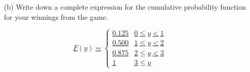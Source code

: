 \documentclass[12pt,a4paper]{article}
\numberwithin{equation}{subsection}
\def\doubleunderline#1{\underline{\underline{#1}}}
\begin{document}
\begin{enumerate}
\begin{enumerate}
    \item[(b)]Write down a complete expression for the cumulative probability function for your winnings from the game.
\end{enumerate}
\doubleunderline{\begin{equation*}
    \textit{F}(\textit{y}) =
    \begin{cases}
    0.125 & 0 \le y < 1 \\
    0.500 & 1 \le y < 2 \\
    0.875 & 2 \le y < 3 \\
    1 & 3 \le y
    \end{cases}
\end{equation*}}

\end{enumerate}
\end{document}
